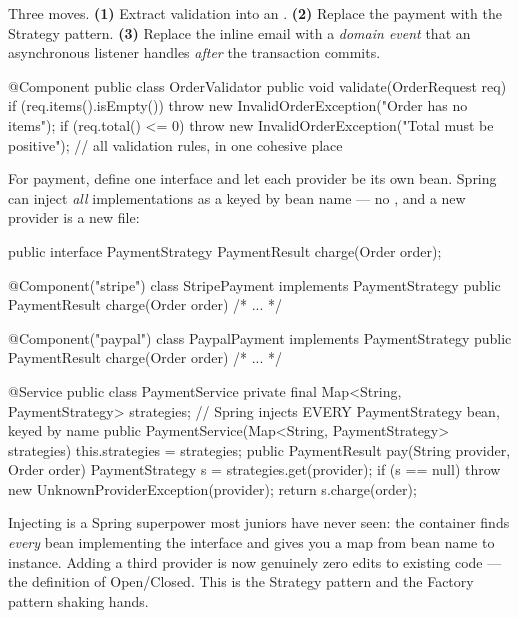  Three moves. \textbf{(1)} Extract validation into an . \textbf{(2)} Replace the payment  with the Strategy pattern. \textbf{(3)} Replace the inline email with a \emph{domain event} that an asynchronous listener handles \emph{after} the transaction commits.

\begin{javabox}
@Component
public class OrderValidator {
  public void validate(OrderRequest req) {
    if (req.items().isEmpty())
      throw new InvalidOrderException("Order has no items");
    if (req.total() <= 0)
      throw new InvalidOrderException("Total must be positive");
    // all validation rules, in one cohesive place
  }
}
\end{javabox}

For payment, define one interface and let each provider be its own bean. Spring can inject \emph{all} implementations as a  keyed by bean name --- no , and a new provider is a new file:

\begin{javabox}
public interface PaymentStrategy {
  PaymentResult charge(Order order);
}

@Component("stripe")
class StripePayment implements PaymentStrategy {
  public PaymentResult charge(Order order) { /* ... */ }
}

@Component("paypal")
class PaypalPayment implements PaymentStrategy {
  public PaymentResult charge(Order order) { /* ... */ }
}
\end{javabox}

\begin{javabox}
@Service
public class PaymentService {
  private final Map<String, PaymentStrategy> strategies;
  // Spring injects EVERY PaymentStrategy bean, keyed by name
  public PaymentService(Map<String, PaymentStrategy> strategies) {
    this.strategies = strategies;
  }
  public PaymentResult pay(String provider, Order order) {
    PaymentStrategy s = strategies.get(provider);
    if (s == null) throw new UnknownProviderException(provider);
    return s.charge(order);
  }
}
\end{javabox}

\begin{behind}
Injecting  is a Spring superpower most juniors have never seen: the container finds \emph{every} bean implementing the interface and gives you a map from bean name to instance. Adding a third provider is now genuinely zero edits to existing code --- the definition of Open/Closed. This is the Strategy pattern and the Factory pattern shaking hands.
\end{behind}

